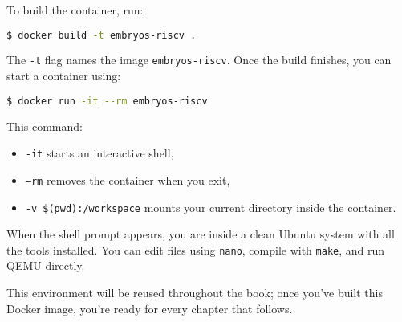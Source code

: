 To build the container, run:

\begin{lstlisting}[style=oscode,language=bash]
$ docker build -t embryos-riscv .
\end{lstlisting}

The \texttt{-t} flag names the image \texttt{embryos-riscv}.  
Once the build finishes, you can start a container using:

\begin{lstlisting}[style=oscode,language=bash]
$ docker run -it --rm embryos-riscv
\end{lstlisting}

This command:
\begin{itemize}
  \item \texttt{-it} starts an interactive shell,
  \item \texttt{--rm} removes the container when you exit,
  \item \texttt{-v \$(pwd):/workspace} mounts your current directory inside the container.
\end{itemize}

When the shell prompt appears, you are inside a clean Ubuntu system with all the
tools installed.  You can edit files using \texttt{nano}, compile with
\texttt{make}, and run QEMU directly.

\bigskip
\noindent
This environment will be reused throughout the book; once you’ve built this
Docker image, you’re ready for every chapter that follows.
